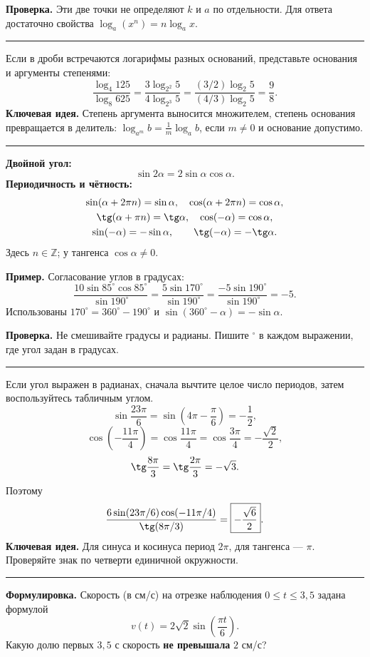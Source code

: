 \documentclass[a4paper,12pt]{article}
\newcommand{\sect}[2]{%
  \Needspace{7\baselineskip}%
  \vspace{6pt}\noindent{\large\textcolor{darkaccent}{#1.\enspace #2}}\par\vspace{-1pt}%
  {\color{accent}\rule{\linewidth}{0.45pt}}\par\vspace{5pt}}
\newcommand{\idea}[1]{\textcolor{darkaccent}{\textbf{Ключевая идея.}} #1}
\newcommand{\warn}[1]{\textcolor{darkaccent}{\textbf{Проверка.}} #1}
\newcommand{\ex}[1]{\textcolor{darkaccent}{\textbf{Пример.}} #1}
\begin{document}
\warn{Эти две точки не определяют $k$ и $a$ по отдельности. Для ответа достаточно свойства $\log_a(x^n)=n\log_a x$.}

\sect{6}{Логарифмы с разными основаниями}
Если в дроби встречаются логарифмы разных оснований, представьте основания и аргументы степенями:
\[
 \frac{\log_4 125}{\log_8 625}
 =\frac{3\log_{2^2}5}{4\log_{2^3}5}
 =\frac{(3/2)\log_2 5}{(4/3)\log_2 5}
 =\boxed{\frac98}.
\]
\idea{Степень аргумента выносится множителем, степень основания превращается в делитель: $\log_{a^m}b=\frac1m\log_a b$, если $m\ne0$ и основание допустимо.}

\sect{7}{Тригонометрия: единые углы}
\textbf{Двойной угол:}
\[
 \sin2\alpha=2\sin\alpha\cos\alpha.
\]
\textbf{Периодичность и чётность:}
\[
\begin{gathered}
\sin(\alpha+2\pi n)=\sin\alpha,\quad
\cos(\alpha+2\pi n)=\cos\alpha,\\
\tg(\alpha+\pi n)=\tg\alpha,\quad
\cos(-\alpha)=\cos\alpha,\\
\sin(-\alpha)=-\sin\alpha,\qquad
\tg(-\alpha)=-\tg\alpha.
\end{gathered}
\]
Здесь $n\in\mathbb Z$; у тангенса $\cos\alpha\ne0$.

\ex{Согласование углов в градусах:}
\[
 \frac{10\sin85^\circ\cos85^\circ}{\sin190^\circ}
 =\frac{5\sin170^\circ}{\sin190^\circ}
 =\frac{-5\sin190^\circ}{\sin190^\circ}
 =\boxed{-5}.
\]
Использованы $170^\circ=360^\circ-190^\circ$ и
$\sin(360^\circ-\alpha)=-\sin\alpha$.

\warn{Не смешивайте градусы и радианы. Пишите $^\circ$ в каждом выражении, где угол задан в градусах.}

\sect{8}{Приведение больших углов к табличным}
Если угол выражен в радианах, сначала вычтите целое число периодов, затем воспользуйтесь табличным углом.
\[
 \sin\frac{23\pi}{6}=\sin\left(4\pi-\frac{\pi}{6}\right)=-\frac12,
\]
\[
 \cos\left(-\frac{11\pi}{4}\right)
 =\cos\frac{11\pi}{4}=\cos\frac{3\pi}{4}=-\frac{\sqrt2}{2},
\]
\[
 \tg\frac{8\pi}{3}=\tg\frac{2\pi}{3}=-\sqrt3.
\]
Поэтому
\[
 \frac{6\sin(23\pi/6)\cos(-11\pi/4)}{\tg(8\pi/3)}
 =\boxed{-\frac{\sqrt6}{2}}.
\]
\idea{Для синуса и косинуса период $2\pi$, для тангенса --- $\pi$. Проверяйте знак по четверти единичной окружности.}

\sect{9}{Прикладная задача: доля времени}
\textbf{Формулировка.} Скорость (в см/с) на отрезке наблюдения $0\le t\le3{,}5$ задана формулой
\[
 v(t)=2\sqrt2\sin\left(\frac{\pi t}{6}\right).
\]
Какую долю первых $3{,}5$ с скорость \textbf{не превышала} $2$ см/с?
\end{document}
